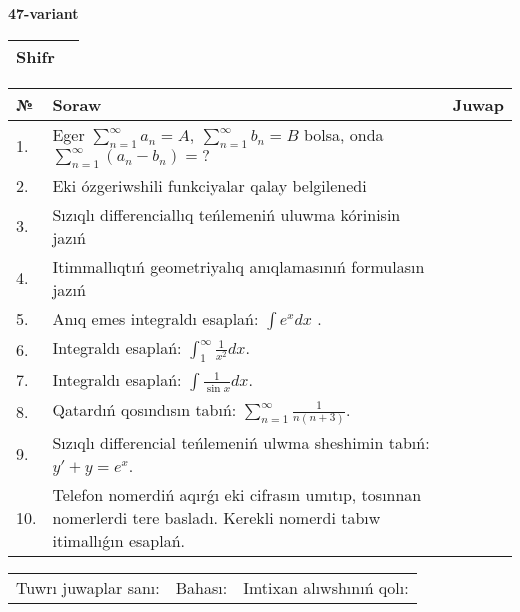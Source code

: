 \documentclass{article}
\begin{document}
  \egroup
  
  \newpage
  
  
  \textbf{47-variant}\\
  
  \bgroup
  \def\arraystretch{1.6} %
  
  \begin{tabular}{|m{5.7cm}|m{9.5cm}|}
  \hline
  Shifr & \\
  \hline
  \end{tabular}
  
  \vspace{1cm}
  
  \begin{tabular}{|m{0.7cm}|m{10cm}|m{4cm}|}
  \hline
  № & Soraw & Juwap \\
  \hline
  1. & Eger \(\sum_{n = 1}^{\infty}a_{n} = A,\ \sum_{n = 1}^{\infty}b_{n} = B\) bolsa, onda \(\sum_{n = 1}^{\infty}\left( a_{n} - b_{n} \right) = ?\) &  \\
  \hline
  2. & Eki ózgeriwshili funkciyalar qalay belgilenedi &  \\
  \hline
  3. & Sızıqlı differenciallıq teńlemeniń uluwma kórinisin jazıń &  \\
  \hline
  4. & Itimmallıqtıń geometriyalıq anıqlamasınıń formulasın jazıń &  \\
  \hline
  5. & Anıq emes integraldı esaplań: \(\int{e^{x}dx}\) . &  \\
  \hline
  6. & Integraldı esaplań: \(\int_{1}^{\infty}{\frac{1}{x^2 }dx}\). &  \\
  \hline
  7. & Integraldı esaplań: \(\int{\frac{1}{\sin x}dx}\). &  \\
  \hline
  8. & Qatardıń qosındısın tabıń: \(\sum_{n = 1}^{\infty}\frac{1}{n(n + 3)}\). &  \\
  \hline
  9. & Sızıqlı differencial teńlemeniń ulwma sheshimin tabıń: \(y' + y = e^{x}\). &  \\
  \hline
  10. & Telefon nomerdiń aqırǵı eki cifrasın umıtıp, tosınnan nomerlerdi tere basladı. Kerekli nomerdi tabıw itimallıǵın esaplań. &  \\
  \hline
  \end{tabular}
  
  \vspace{1cm}
  
  \begin{tabular}{lll}
  Tuwrı juwaplar sanı: \underline{\hspace{1.5cm}} & 
  Bahası: \underline{\hspace{1.5cm}} & 
  Imtixan alıwshınıń qolı: \underline{\hspace{2cm}} \\
  \end{tabular}
  
\end{document}
